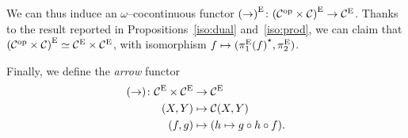 We can thus induce an \(\omega\)--cocontinuous functor \({(\rightarrow)}^\textup{E} \colon {(\mathcal{C}^\textup{op} \times \mathcal{C})}^\textup{E}\to \mathcal{C}^\textup{E}\). %
Thanks to the result reported in Propositions~\ref{iso:dual} and~\ref{iso:prod}, we can claim that \({(\mathcal{C}^\textup{op} \times \mathcal{C})}^\textup{E} \simeq \mathcal{C}^\textup{E} \times \mathcal{C}^\textup{E}\), with isomorphism
\(f \mapsto ({\pi_1^\textup{E}(f)}^\star, \pi_2^\textup{E})\).

Finally, we define the \emph{arrow} functor
\begin{equation*}
  \begin{split}
    (\rightarrow) \colon \mathcal{C}^\textup{E} \times \mathcal{C}^\textup{E} &\to \mathcal{C}^\textup{E} \\
    (X,Y) &\mapsto \mathcal{C}(X,Y) \\
    (f,g) &\mapsto (h \mapsto g \circ h \circ f).
  \end{split}
\end{equation*}
